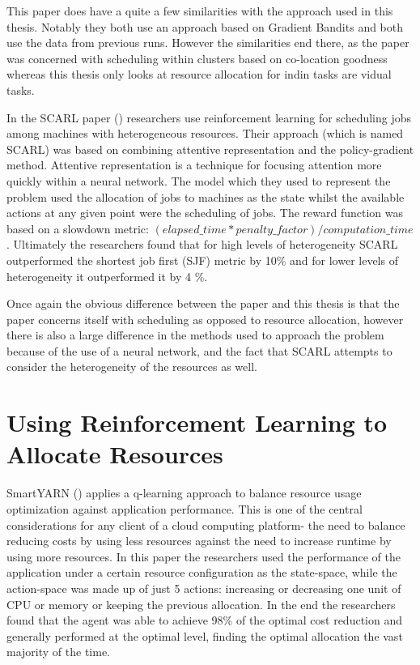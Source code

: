 This paper does have a quite a few similarities with the approach used in this thesis. Notably they both use an approach based on Gradient Bandits and both use the data from previous runs. However the similarities end there, as the paper was concerned with scheduling within clusters based on co-location goodness whereas this thesis only looks at resource allocation for indin tasks are vidual tasks. 

In the SCARL paper (\cite{scarl}) researchers use reinforcement learning for scheduling jobs among machines with heterogeneous resources. Their approach (which is named SCARL) was based on combining attentive representation and the policy-gradient method. Attentive representation is a technique for focusing attention more quickly within a neural network. The model which they used to represent the problem used the allocation of jobs to machines as the state whilst the available actions at any given point were the scheduling of jobs. The reward function was based on a slowdown metric: $(elapsed\_time * penalty\_ factor) / computation\_time$. Ultimately the researchers found that for high levels of heterogeneity SCARL outperformed the shortest job first (SJF) metric by 10\% and for lower levels of heterogeneity it outperformed it by 4 \%.

Once again the obvious difference between the paper and this thesis is that the paper concerns itself with scheduling as opposed to resource allocation, however there is also a large difference in the methods used to approach the problem because of the use of a neural network, and the fact that SCARL attempts to consider the heterogeneity of the resources as well. 

\section{Using Reinforcement Learning to Allocate Resources}
 \label{sec:rl_allocation}
 
SmartYARN (\cite{smartYarn}) applies a q-learning approach to balance resource usage optimization against application performance. This is one of the central considerations for any client of a cloud computing platform- the need to balance reducing costs by using less resources against the need to increase runtime by using more resources. In this paper the researchers used the performance of the application under a certain resource configuration as the state-space, while the action-space was made up of just 5 actions: increasing or decreasing one unit of CPU or memory or keeping the previous allocation. In the end the researchers found that the agent was able to achieve 98\% of the optimal cost reduction and generally performed at the optimal level, finding the optimal allocation the vast majority of the time.

